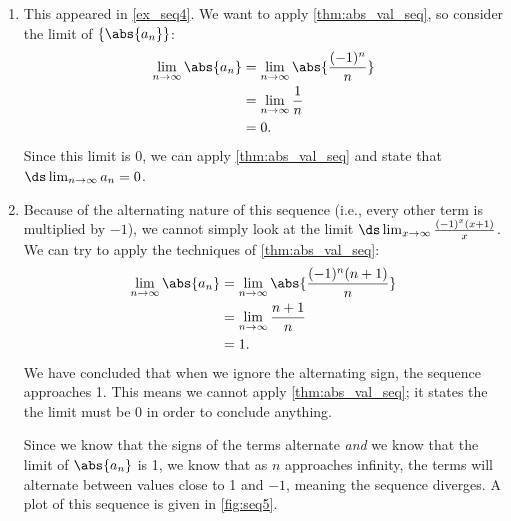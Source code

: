 {\begin{enumerate}
\item		This appeared in \autoref{ex_seq4}. We want to apply \autoref{thm:abs_val_seq}, so consider the limit of $\{\abs{a_n}\}$:
\begin{align*}
\lim_{n\to\infty}\abs{a_n}&= \lim_{n\to\infty} \abs{\frac{(-1)^n}{n}} \\
					&= \lim_{n\to\infty} \frac1n \\
					&= 0.
\end{align*}
Since this limit is 0, we can apply \autoref{thm:abs_val_seq} and state that $\ds\lim_{n\to\infty} a_n=0$.

\item Because of the alternating nature of this sequence (i.e., every other term is multiplied by $-1$), we cannot simply look at the limit $\ds \lim_{x\to\infty} \frac{(-1)^x(x+1)}{x}$. We can try to apply the techniques of \autoref{thm:abs_val_seq}:
\begin{align*}
	\lim_{n\to\infty}\abs{a_n}
	&= \lim_{n\to\infty} \abs{\frac{(-1)^n(n+1)}{n}} \\
	&= \lim_{n\to\infty} \frac{n+1}{n}\\
	&= 1.
\end{align*}
%
%
%
We have concluded that when we ignore the alternating sign, the se\-quence approaches 1. This means we cannot apply \autoref{thm:abs_val_seq}; it states the the limit must be 0 in order to conclude anything.

Since we know that the signs of the terms alternate \emph{and} we know that the limit of $\abs{a_n}$ is 1, we know that as $n$ approaches infinity, the terms will alternate between values close to 1 and $-1$, meaning the sequence diverges. A plot of this sequence is given in \autoref{fig:seq5}.\eoehere
\end{enumerate}}

